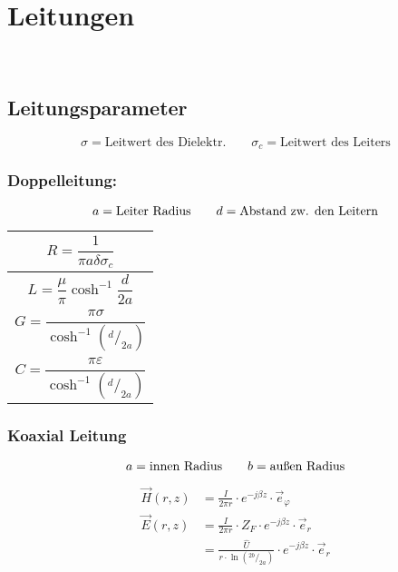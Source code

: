 \section{Leitungen}
\textbf{\color{red}{Leitungen gehen HIN und ZURÜCK!!!}\\
    \color{red}{Länge verdoppeln!!!}
}
\subsection{Leitungsparameter}

{\small\[
        \sigma = \text{Leitwert des Dielektr.} \qquad \sigma_c = \text{Leitwert des Leiters}
    \]}

\subsubsection{Doppelleitung:}
{\small\[
        a = \text{Leiter Radius} \qquad d = \text{Abstand zw. den Leitern} \\
    \]}


{\renewcommand*{\arraystretch}{0.2}
    \begin{tabularx}{0.5\columnwidth}{|X|}
        \hline
        \[R  = \frac{1}{\pi a\delta\sigma_c}\]              \\
        \hline
        \[L = \frac{\mu}{\pi} \cosh^{-1}\frac{d}{2a}\]      \\
        \hline
        \[G = \frac{\pi\sigma}{\cosh^{-1}(^d/_{2a})}\]      \\
        \hline
        \[C = \frac{\pi\varepsilon}{\cosh^{-1}(^d/_{2a})}\] \\
        \hline
    \end{tabularx}}

\subsubsection{Koaxial Leitung}
{\small\[
        a = \text{innen Radius} \qquad b = \text{außen Radius} \\
    \]}

\begin{align*}
    \vec{H}(r, z) & = \frac{I}{2\pi r}\cdot e^{-j\beta z}\cdot\vec{e}_\varphi                    \\
    \vec{E}(r, z) & = \frac{I}{2\pi r}\cdot Z_F\cdot e^{-j\beta z} \cdot\vec{e}_r                \\
                  & = \frac{\hat{U}}{r \cdot\ln{(^{2b}/_{2a})}}\cdot e^{-j\beta z}\cdot\vec{e}_r
\end{align*}

